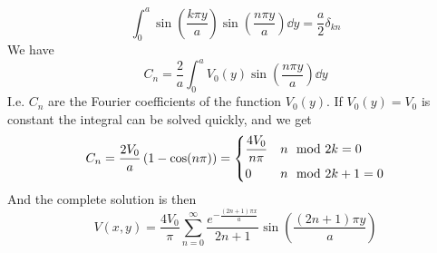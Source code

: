 \documentclass[../electromagnetism]{subfiles}
\begin{document}
\begin{eg}
\begin{equation*}
		\int_{0}^{a}\sin\left( \frac{k\pi y}{a} \right)\sin\left( \frac{n\pi y}{a} \right)\dd y=\frac{a}{2}\delta_{kn}
	\end{equation*}
	We have
	\begin{equation*}
		C_n=\frac{2}{a}\int_{0}^{a}V_0(y)\sin\left( \frac{n\pi y}{a} \right)\dd y
	\end{equation*}
	I.e. $C_n$ are the Fourier coefficients of the function $V_0(y)$. If $V_0(y)=V_0$ is constant the integral can be solved quickly, and we get
	\begin{equation*}
		C_n=\frac{2V_0}{a}\left( 1-\cos(n\pi) \right)=\begin{dcases}\frac{4V_0}{n\pi}&n\mod 2k=0\\0&n\mod 2k+1=0\end{dcases}
	\end{equation*}
	And the complete solution is then
	\begin{equation*}
		V(x,y)=\frac{4V_0}{\pi}\sum_{n=0}^\infty\frac{e^{-\frac{(2n+1)\pi x}{a}}}{2n+1}\sin\left( \frac{(2n+1)\pi y}{a} \right)
	\end{equation*}
\end{eg}
\end{document}
